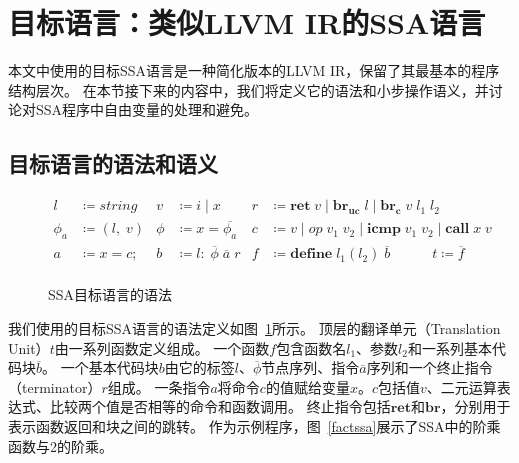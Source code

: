 \section{目标语言：类似LLVM IR的SSA语言}

本文中使用的目标SSA语言是一种简化版本的LLVM IR，保留了其最基本的程序结构层次。
在本节接下来的内容中，我们将定义它的语法和小步操作语义，并讨论对SSA程序中自由变量的处理和避免。

\subsection{目标语言的语法和语义}

\begin{figure}[htbp]
    \centering
    \begin{equation}
        \nonumber
        \begin{aligned}
            l &\coloneqq string & v &\coloneqq i\; |\; x & r &\coloneqq \mathbf{ret}\; v\; |\; \mathbf{br_{uc}}\; l\; |\; \mathbf{br_c}\; v\; l_1\; l_2 \\
            \phi_a &\coloneqq (l,\; v) & \phi &\coloneqq x = \overline{\phi_a} &  c &\coloneqq v\; |\; op\; v_1\; v_2\; |\; \mathbf{icmp}\; v_1\; v_2\; |\; \mathbf{call}\; x\; v \\
            a &\coloneqq x = c; & b &\coloneqq l:\; \overline{\phi}\; \overline{a}\; r & f &\coloneqq \mathbf{define}\; l_1(l_2)\; \overline{b} \quad\quad\quad t \coloneqq \overline{f} \\
        \end{aligned}
    \end{equation}
    \caption{SSA目标语言的语法}\label{synssa}
\end{figure}

我们使用的目标SSA语言的语法定义如图~\ref{synssa}所示。
顶层的翻译单元（Translation Unit）$t$由一系列函数定义组成。
一个函数$f$包含函数名$l_1$、参数$l_2$和一系列基本代码块$\overline{b}$。
一个基本代码块$b$由它的标签$l$、$\overline{\phi}$节点序列、指令$\overline{a}$序列和一个终止指令（terminator）$r$组成。
一条指令$a$将命令$c$的值赋给变量$x$。$c$包括值$v$、二元运算表达式、比较两个值是否相等的命令和函数调用。
终止指令包括$\mathbf{ret}$和$\mathbf{br}$，分别用于表示函数返回和块之间的跳转。
作为示例程序，图~\ref{factssa}展示了SSA中的阶乘函数与2的阶乘。

